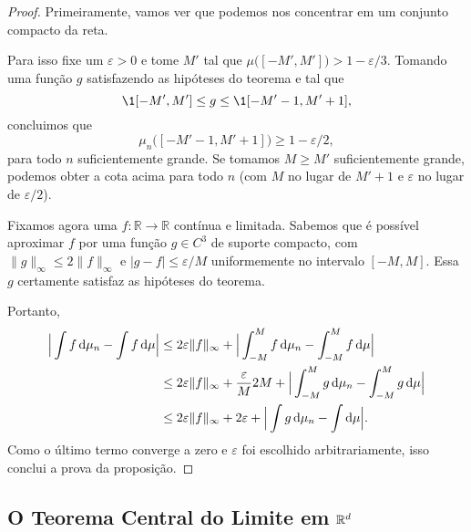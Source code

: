 \begin{proof}
  Primeiramente, vamos ver que podemos nos concentrar em um conjunto compacto da reta.

  Para isso fixe um $\varepsilon > 0$ e tome $M'$ tal que $\mu\big( [-M', M'] \big) > 1 - \varepsilon / 3$.
  Tomando uma função $g$ satisfazendo as hipóteses do teorema e tal que
  \begin{equation}
    \1{[-M',M']} \leq g \leq \1{[-M'-1,M'+1]},
  \end{equation}
  concluimos que
  \begin{equation}
    \mu_n \big( [-M'-1, M'+1] \big) \geq 1 - \varepsilon/2,
  \end{equation}
  para todo $n$ suficientemente grande.
  Se tomamos $M \geq M'$ suficientemente grande, podemos obter a cota acima para todo $n$ (com $M$ no lugar de $M'+1$ e $\varepsilon$ no lugar de $\varepsilon/2$).

  Fixamos agora uma $f: \mathbb{R} \to \mathbb{R}$ contínua e limitada.
  Sabemos que é possível aproximar $f$ por uma função $g \in C^3$ de suporte compacto, com $\lVert g \rVert_\infty \leq 2 \lVert f \rVert_\infty$ e $|g - f| \leq \varepsilon/M$ uniformemente no intervalo $[-M,M]$.
  Essa $g$ certamente satisfaz as hipóteses do teorema.

  Portanto,
  \begin{equation*}
    \begin{split}
      \Big| \int f \d \mu_n - \int f \d \mu\Big| & \leq 2 \varepsilon \lVert f \rVert_\infty + \Big| \int_{-M}^M f \d \mu_n - \int_{-M}^M f \d \mu\Big|\\
      & \leq 2 \varepsilon \lVert f \rVert_\infty + \frac \varepsilon{M} 2 M + \Big| \int_{-M}^M g \d \mu_n - \int_{-M}^M g \d \mu\Big|\\
      & \leq 2 \varepsilon \lVert f \rVert_\infty + 2 \varepsilon + \Big| \int g \d \mu_n - \int \d \mu\Big|.
    \end{split}
  \end{equation*}
  Como o último termo converge a zero e $\varepsilon$ foi escolhido arbitrariamente, isso conclui a prova da proposição.
\end{proof}



\subsection{O Teorema Central do Limite em ${\mathbb R}^d$}

